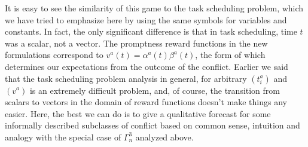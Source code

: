 It is easy to see the similarity of this game to the task scheduling problem, which we have tried to emphasize here by using the same symbols for variables and constants. In fact, the only significant difference is that in task scheduling, time $t$ was a scalar, not a vector. The promptness reward functions in the new formulations correspond to $v^a(t) = \alpha^a(t) \beta^a(t)$, the form of which determines our expectations from the outcome of the conflict. Earlier we said that the task scheduling problem analysis in general, for arbitrary $(t_i^a)$ and $(v^a)$ is an extremely difficult problem, and, of course, the transition from scalars to vectors in the domain of reward functions doesn't make things any easier. Here, the best we can do is to give a qualitative forecast for some informally described subclasses of conflict based on common sense, intuition and analogy with the special case of $\Gamma^3_n$ analyzed above. %

